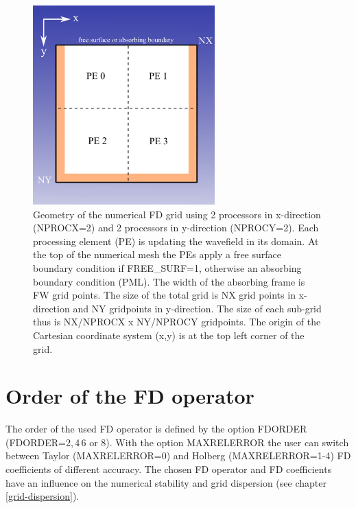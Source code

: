\begin{figure}
\begin{center}
\includegraphics[width=7cm,angle=0]{figures/sketch_grid.png}
\end{center}
\caption{Geometry of the numerical FD grid using 2 processors in x-direction (NPROCX=2) and 2 processors in y-direction (NPROCY=2). Each processing element (PE) is updating the wavefield in its domain.
At the top of the numerical mesh the PEs apply a free surface boundary condition if FREE\_SURF=1, otherwise an absorbing boundary condition (PML). The width of the absorbing frame is FW grid points.  The size of the total grid is NX grid points in x-direction and NY gridpoints in y-direction. The size of each sub-grid  thus is NX/NPROCX x NY/NPROCY gridpoints. The origin of the Cartesian coordinate system (x,y) is at the top left corner of the grid.}
\label{fig_grid_json}
\end{figure}

\FloatBarrier
\newpage


\section{Order of the FD operator}
{\color{blue}{\begin{verbatim}
"FD order" : "comment",
			"FDORDER" : "2",
			"MAXRELERROR" : "0",
\end{verbatim}}}
The order of the used FD operator is defined by the option FDORDER (FDORDER=2,\,4\,6 or 8). With the option MAXRELERROR the user can switch between Taylor (MAXRELERROR=0) and Holberg (MAXRELERROR=1-4) FD coefficients of different accuracy. The chosen FD operator and FD coefficients have an influence on the numerical stability and grid dispersion (see chapter \ref{grid-dispersion}).

